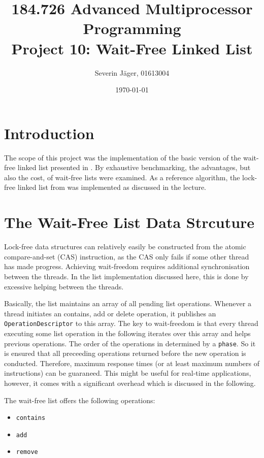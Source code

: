 \documentclass[a4paper, 12pt]{article}
\title{184.726 Advanced Multiprocessor Programming\\
	   Project 10: Wait-Free Linked List}
\author{
  Severin Jäger, 01613004
}
\date{\today}
\begin{document}
\maketitle
\tableofcontents
\pagebreak

\section{Introduction}

The scope of this project was the implementation of the basic version of the wait-free linked list presented in \cite{timnat12}. By exhaustive benchmarking, the advantages, but also the cost, of wait-free lists were examined. As a reference algorithm, the lock-free linked list from \cite{harris01} was implemented as discussed in the lecture.

\section{The Wait-Free List Data Strcuture}


Lock-free data structures can relatively easily be constructed from the atomic compare-and-set (CAS) instruction, as the CAS only fails if some other thread has made progress. Achieving wait-freedom requires additional synchronisation between the threads. In the list implementation discussed here, this is done by excessive helping between the threads.

Basically, the list maintains an array of all pending list operations. Whenever a thread initiates an contains, add or delete operation, it publishes an \verb|OperationDescriptor| to this array. The key to wait-freedom is that every thread executing some list operation in the following iterates over this array and helps previous operations. The order of the operations in determined by a \verb|phase|. So it is ensured that all preceeding operations returned before the new operation is conducted. Therefore, maximum response times (or at least maximum numbers of instructions) can be guaraneed. This might be useful for real-time applications, however, it comes with a significant overhead which is discussed in the following.

The wait-free list offers the following operations:
\begin{itemize}
\setlength\itemsep{0em}
\item{\verb|contains|}
\item{\verb|add|}
\item{\verb|remove|}
\end{itemize}
\end{document}
